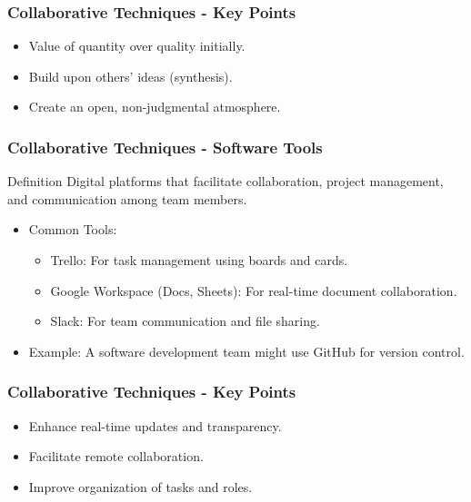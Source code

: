 \documentclass{beamer}
\begin{document}
\begin{frame}[fragile]
    \frametitle{Collaborative Techniques - Key Points}
    \begin{itemize}
        \item Value of quantity over quality initially.
        \item Build upon others' ideas (synthesis).
        \item Create an open, non-judgmental atmosphere.
    \end{itemize}
\end{frame}

\begin{frame}[fragile]
    \frametitle{Collaborative Techniques - Software Tools}
    \begin{block}{Definition}
        Digital platforms that facilitate collaboration, project management, and communication among team members.
    \end{block}
    \begin{itemize}
        \item Common Tools:
        \begin{itemize}
            \item Trello: For task management using boards and cards.
            \item Google Workspace (Docs, Sheets): For real-time document collaboration.
            \item Slack: For team communication and file sharing.
        \end{itemize}
        \item Example: A software development team might use GitHub for version control.
    \end{itemize}
\end{frame}

\begin{frame}[fragile]
    \frametitle{Collaborative Techniques - Key Points}
    \begin{itemize}
        \item Enhance real-time updates and transparency.
        \item Facilitate remote collaboration.
        \item Improve organization of tasks and roles.
    \end{itemize}
\end{frame}
\end{document}
